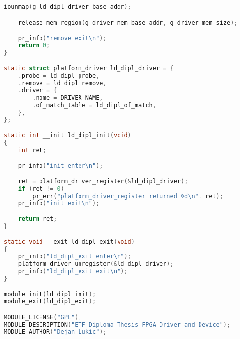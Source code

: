 \begin{lstlisting}[language=C]
	iounmap(g_ld_dipl_driver_base_addr);

	release_mem_region(g_driver_mem_base_addr, g_driver_mem_size);

	pr_info("remove exit\n");
	return 0;
}

static struct platform_driver ld_dipl_driver = {
	.probe = ld_dipl_probe,
	.remove = ld_dipl_remove,
	.driver = {
		.name = DRIVER_NAME,
		.of_match_table = ld_dipl_of_match,
	},
};

static int __init ld_dipl_init(void)
{
	int ret;

	pr_info("init enter\n");

	ret = platform_driver_register(&ld_dipl_driver);
	if (ret != 0)
		pr_err("platform_driver_register returned %d\n", ret);
	pr_info("init exit\n");

	return ret;
}

static void __exit ld_dipl_exit(void)
{
	pr_info("ld_dipl_exit enter\n");
	platform_driver_unregister(&ld_dipl_driver);
	pr_info("ld_dipl_exit exit\n");
}

module_init(ld_dipl_init);
module_exit(ld_dipl_exit);

MODULE_LICENSE("GPL");
MODULE_DESCRIPTION("ETF Diploma Thesis FPGA Driver and Device");
MODULE_AUTHOR("Dejan Lukic");
\end{lstlisting}

